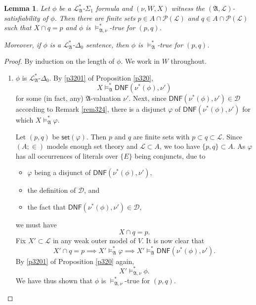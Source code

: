 \documentclass[12pt, twoside]{memoir}
\numberwithin{equation}{section}
\newtheorem{lem}[thm]{Lemma}
\theoremstyle{definition}
\theoremstyle{remark}
\theoremstyle{definition}
\theoremstyle{definition}
\theoremstyle{definition}
\theoremstyle{remark}
\begin{document}
\begin{lem}\label{exist}
Let $\phi$ be a $\mathcal{L}^{*}_{\mathfrak{A}}$-$\Sigma_1$ formula and $(\nu, W, X)$ witness the $(\mathfrak{A}, \mathcal{L})$-satisfiability of $\phi$. Then there are finite sets $p \in A \cap \mathcal{P}(\mathcal{L})$ and $q \in A \cap \mathcal{P}(\mathcal{L})$ such that $X \cap q = p$ and $\phi$ is $\models^*_{\mathfrak{A}, \nu}$-true for $(p, q)$.

Moreover, if $\phi$ is a $\mathcal{L}^{*}_{\mathfrak{A}}$-$\Delta_0$ sentence, then $\phi$ is $\models^*_{\mathfrak{A}}$-true for $(p, q)$.
\end{lem}

\begin{proof}
By induction on the length of $\phi$. We work in $W$ throughout.
\begin{enumerate}[label=Case \arabic*:, leftmargin=50pt]
    \item\label{5132c1} $\phi$ is $\mathcal{L}^{*}_{\mathfrak{A}}$-$\Delta_0$. By \ref{p3201} of Proposition \ref{p320}, $$X \models^*_{\mathfrak{A}} \mathsf{DNF}(\nu^*(\phi), \nu')$$ for some (in fact, any) $\mathfrak{A}$-valuation $\nu'$. Next, since $\mathsf{DNF}(\nu^*(\phi), \nu') \in \mathcal{D}$ according to Remark \ref{rem324}, there is a disjunct $\varphi$ of $\mathsf{DNF}(\nu^*(\phi), \nu')$ for which $X \models^*_{\mathfrak{A}} \varphi$. 
    
    Let $(p, q)$ be $\mathsf{set}(\varphi)$. Then $p$ and $q$ are finite sets with $p \subset q \subset \mathcal{L}$. Since $(A; \in)$ models enough set theory and $\mathcal{L} \subset A$, we too have $\{p, q\} \subset A$. As $\varphi$ has all occurrences of literals over $\{E\}$ being conjuncts, due to 
    \begin{itemize}
        \item $\varphi$ being a disjunct of $\mathsf{DNF}(\nu^*(\phi), \nu')$,
        \item the definition of $\mathcal{D}$, and 
        \item the fact that $\mathsf{DNF}(\nu^*(\phi), \nu') \in \mathcal{D}$, 
    \end{itemize} 
    we must have $$X \cap q = p.$$ Fix $X' \subset \mathcal{L}$ in any weak outer model of $V$. It is now clear that $$X' \cap q = p \implies X' \models^*_{\mathfrak{A}} \varphi \implies X' \models^*_{\mathfrak{A}} \mathsf{DNF}(\nu^*(\phi), \nu').$$ By \ref{p3201} of Proposition \ref{p320} again, $$X' \models^*_{\mathfrak{A}, \nu} \phi \text{.}$$ We have thus shown that $\phi$ is $\models^*_{\mathfrak{A}, \nu}$-true for $(p, q)$.


\end{enumerate}
\end{proof}
\end{document}
